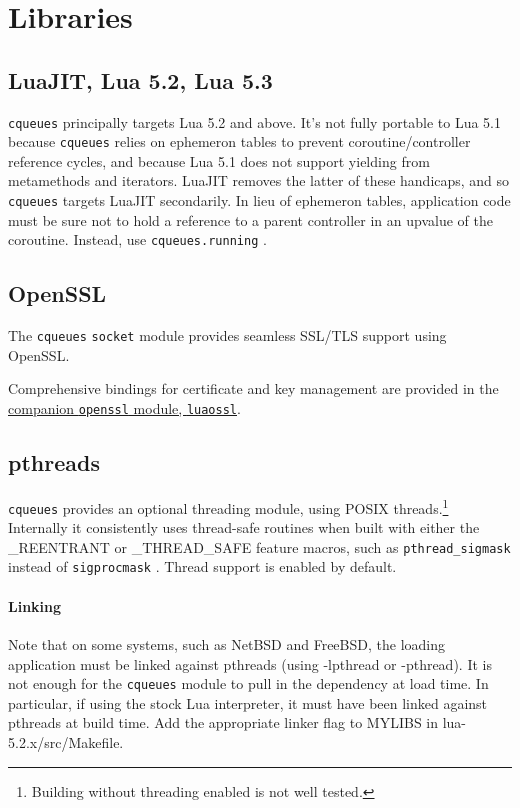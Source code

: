 \documentclass[11pt, oneside]{memoir}
\newcommand{\cqueues}[0]{\texttt{cqueues} }
\newcommand{\syscall}[1]{\texttt{#1} }
\newcommand{\fn}[1]{\texttt{#1} }
\newcommand{\module}[1]{\texttt{#1} }
\begin{document}
\section{Libraries}

\subsection{LuaJIT, Lua 5.2, Lua 5.3}
\cqueues principally targets Lua 5.2 and above. It's not fully portable to Lua 5.1 because \cqueues relies on ephemeron tables to prevent coroutine/controller reference cycles, and because Lua 5.1 does not support yielding from metamethods and iterators. LuaJIT removes the latter of these handicaps, and so \cqueues targets LuaJIT secondarily. In lieu of ephemeron tables, application code must be sure not to hold a reference to a parent controller in an upvalue of the coroutine. Instead, use \fn{cqueues.running}.

\subsection{OpenSSL}
The \cqueues \module{socket} module provides seamless SSL/TLS support using OpenSSL.

Comprehensive bindings for certificate and key management are provided in the \href{http://25thandClement.com/~william/projects/luaossl.html}{companion \module{openssl} module, \texttt{luaossl}}.

\subsection{pthreads}

\cqueues provides an optional threading module, using POSIX threads.\footnote{Building without threading enabled is not well tested.} Internally it consistently uses thread-safe routines when built with either the \_REENTRANT or \_THREAD\_SAFE feature macros, such as \syscall{pthread\_sigmask} instead of \syscall{sigprocmask}. Thread support is enabled by default.

\paragraph{Linking}
Note that on some systems, such as NetBSD and FreeBSD, the loading application must be linked against pthreads (using -lpthread or -pthread). It is not enough for the \cqueues module to pull in the dependency at load time. In particular, if using the stock Lua interpreter, it must have been linked against pthreads at build time. Add the appropriate linker flag to MYLIBS in lua-5.2.x/src/Makefile.
\end{document}
